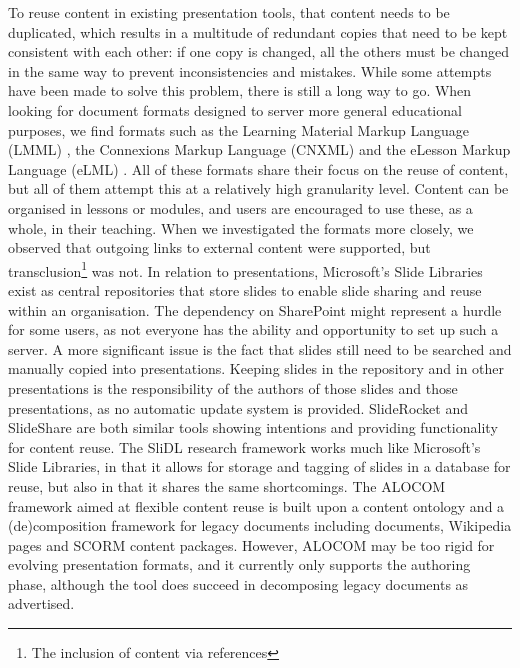    To reuse content in existing presentation tools, that content needs to be
   duplicated, which results in a multitude of redundant copies that need to be
   kept consistent with each other: if one copy is changed, all the others must
   be changed in the same way to prevent inconsistencies and mistakes. While
   some attempts have been made to solve this problem, there is still a long
   way to go. When looking for document formats designed to server more general
   educational purposes, we find formats such as the Learning Material Markup
   Language (LMML) \citep{suss-1}, the Connexions Markup Language (CNXML) and
   the eLesson Markup Language (eLML) \citep{fisler-1}. All of these formats
   share their focus on the reuse of content, but all of them attempt this at a
   relatively high granularity level. Content can be organised in lessons or
   modules, and users are encouraged to use these, as a whole, in their
   teaching. When we investigated the formats more closely, we observed that
   outgoing links to external content were supported, but
   transclusion\footnote{The inclusion of content via references} was not. In
   relation to presentations, Microsoft's Slide Libraries exist as central
   repositories that store slides to enable slide sharing and reuse within an
   organisation. The dependency on SharePoint might represent a hurdle for some
   users, as not everyone has the ability and opportunity to set up such a
   server. A more significant issue is the fact that slides still need to be
   searched and manually copied into presentations. Keeping slides in the
   repository and in other presentations is the responsibility of the authors
   of those slides and those presentations, as no automatic update system is
   provided. SlideRocket and SlideShare are both similar tools showing
   intentions and providing functionality for content reuse. The SliDL
   \citep{canos-1} research framework works much like Microsoft's Slide
   Libraries, in that it allows for storage and tagging of slides in a database
   for reuse, but also in that it shares the same shortcomings. The ALOCOM
   \citep{verbert-1} framework aimed at flexible content reuse is built upon a
   content ontology and a (de)composition framework for legacy documents
   including \ppt documents, Wikipedia pages and SCORM content packages.
   However, ALOCOM may be too rigid for evolving presentation formats, and it
   currently only supports the authoring phase, although the tool does succeed
   in decomposing legacy documents as advertised.

